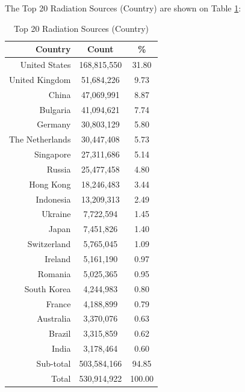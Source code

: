 \newpage
The Top 20 Radiation Sources (Country) are shown on Table \ref{tab:top20radiationsources(country)}:
\begin{table}[!h]
\begin{center}
\caption{Top 20 Radiation Sources (Country)}
\label{tab:top20radiationsources(country)}
\begin{tabular}{ |r|c|c| }
\hline
\centering Country & Count & \%  \\
\hline
United States & 168,815,550 & 31.80  \\
United Kingdom & 51,684,226 & 9.73  \\
China & 47,069,991 & 8.87  \\
Bulgaria & 41,094,621 & 7.74  \\
Germany & 30,803,129 & 5.80  \\
The Netherlands & 30,447,408 & 5.73  \\
Singapore & 27,311,686 & 5.14  \\
Russia & 25,477,458 & 4.80  \\
Hong Kong & 18,246,483 & 3.44  \\
Indonesia & 13,209,313 & 2.49  \\
Ukraine & 7,722,594 & 1.45  \\
Japan & 7,451,826 & 1.40  \\
Switzerland & 5,765,045 & 1.09  \\
Ireland & 5,161,190 & 0.97  \\
Romania & 5,025,365 & 0.95  \\
South Korea & 4,244,983 & 0.80  \\
France & 4,188,899 & 0.79  \\
Australia & 3,370,076 & 0.63  \\
Brazil & 3,315,859 & 0.62  \\
India & 3,178,464 & 0.60  \\
\hline
Sub-total & 503,584,166 & 94.85  \\
\hline
Total & 530,914,922 & 100.00  \\
\hline
\end{tabular}
\end{center}
\end{table}

